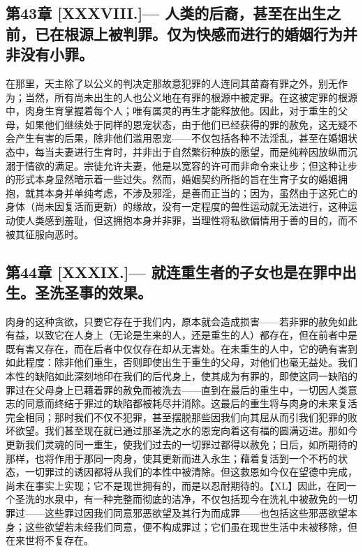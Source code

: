 
\subsection{第43章 [XXXVIII.]— 人类的后裔，甚至在出生之前，已在根源上被判罪。仅为快感而进行的婚姻行为并非没有小罪。}

在那里，天主除了以公义的判决定那故意犯罪的人连同其苗裔有罪之外，别无作为；当然，所有尚未出生的人也公义地在有罪的根源中被定罪。在这被定罪的根源中，肉身生育掌握着每个人；唯有属灵的再生才能释放他。因此，对于重生的父母，如果他们继续处于同样的恩宠状态，由于他们已经获得的罪的赦免，这无疑不会产生有害的后果，除非他们滥用恩宠——不仅包括各种不法淫乱，甚至在婚姻状态中，每当夫妻进行生育时，并非出于自然繁衍种族的愿望，而是纯粹因放纵而沉溺于情欲的满足。宗徒允许夫妻，他是以宽容的许可而非命令来让步；但这种让步的形式本身显然暗示着一些过失。然而，婚姻契约所指的旨在生育子女的婚姻拥抱，就其本身并单纯考虑，不涉及邪淫，是善而正当的；因为，虽然由于这死亡的身体（尚未因复活而更新）的缘故，没有一定程度的兽性运动就无法进行，这种运动使人类感到羞耻，但这拥抱本身并非罪，当理性将私欲偏情用于善的目的，而不被其征服向恶时。\par


\subsection{第44章 [XXXIX.]— 就连重生者的子女也是在罪中出生。圣洗圣事的效果。}

肉身的这种贪欲，只要它存在于我们内，原本就会造成损害——若非罪的赦免如此有益，以致它在人身上（无论是生来的人，还是重生的人）都存在，但在前者中是既有害又存在，而在后者中仅仅存在却从无害处。在未重生的人中，它的确有害到如此程度：除非他们重生，否则即使出生于重生的父母，对他们也毫无益处。我们本性的缺陷如此深刻地印在我们的后代身上，使其成为有罪的，即使这同一缺陷的罪过在父母身上已藉着罪的赦免而被洗去——直到在最后的重生中，一切因人类意志的同意而终结于罪过的缺陷都被耗尽并消除。这最后的重生将与肉身的未来复活完全相同；那时我们不仅不犯罪，甚至摆脱那些因我们向其屈从而引我们犯罪的败坏欲望。我们甚至现在就已通过那圣洗之水的恩宠向着这有福的圆满迈进。那如今更新我们灵魂的同一重生，使我们过去的一切罪过都得以赦免；日后，如所期待的那样，也将作用于那同一肉身，使其更新而进入永生；藉着复活到一个不朽的状态，一切罪过的诱因都将从我们的本性中被清除。但这救恩如今仅在望德中完成，尚未在事实上实现；它不是现世拥有的，而是以忍耐期待的。\newline{}【XL】因此，在同一个圣洗的水泉中，有一种完整而彻底的洁净，不仅包括现今在洗礼中被赦免的一切罪过——这些罪过因我们同意邪恶欲望及其行为而成罪——也包括这些邪恶欲望本身；这些欲望若未经我们同意，便不构成罪过；它们虽在现世生活中未被移除，但在来世将不复存在。\par

